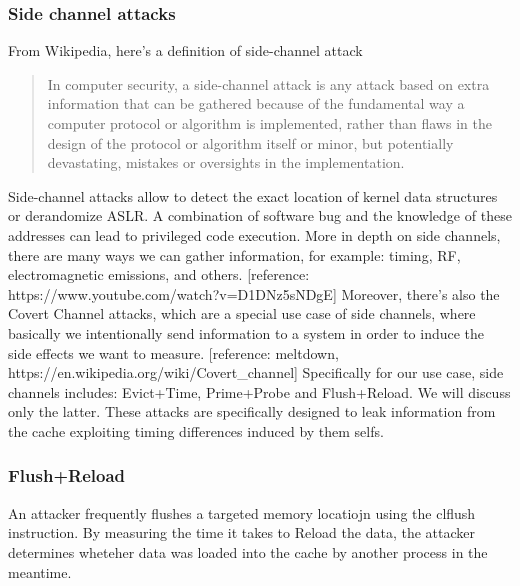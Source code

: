 \subsubsection{Side channel attacks}
From Wikipedia, here's a definition of side-channel attack
\begin{quotation}
    In computer security, a side-channel attack is any attack based on extra
    information that can be gathered because of the fundamental way a computer
    protocol or algorithm is implemented, rather than flaws in the design of the
    protocol or algorithm itself or minor, but potentially devastating, mistakes
    or oversights in the implementation.
\end{quotation}
Side-channel attacks allow to detect the exact location of kernel data structures or derandomize ASLR. A combination of
software bug and the knowledge of these addresses can lead to privileged code execution.
More in depth on side channels, there are many ways we can gather information, for example: timing, RF, electromagnetic emissions, and others.
[reference: https://www.youtube.com/watch?v=D1DNz5sNDgE]
Moreover, there's also the Covert Channel attacks, which are a special use case of side channels, where basically we intentionally send information
to a system in order to induce the side effects we want to measure.
[reference: meltdown, https://en.wikipedia.org/wiki/Covert\_channel]
Specifically for our use case, side channels includes: Evict+Time, Prime+Probe and Flush+Reload. We will discuss only the latter.
These attacks are specifically designed to leak information from the cache exploiting timing differences induced by them selfs.
\subsubsection{Flush+Reload}
An attacker frequently flushes a targeted memory locatiojn using the clflush instruction. By measuring the time it takes to Reload
the data, the attacker determines wheteher data was loaded into the cache by another process in the meantime.



